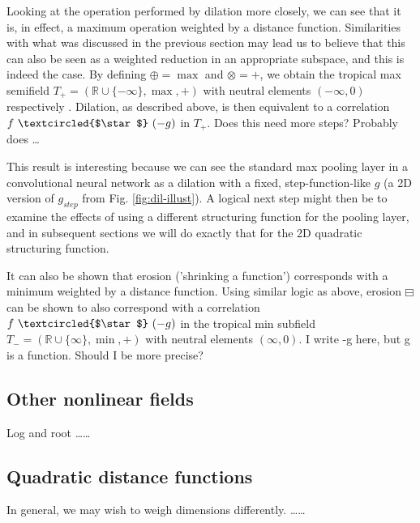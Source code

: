 \documentclass[11pt]{article} %
\def\comment#1{\color{red}#1\color{black}}
\begin{document}
Looking at the operation performed by dilation more closely, we can see that it is, in effect, a maximum operation weighted by a distance function. Similarities with what was discussed in the previous section may lead us to believe that this can also be seen as a weighted reduction in an appropriate subspace, and this is indeed the case. By defining $\oplus=\max$ and $\otimes=+$, we obtain the tropical max semifield $T_+=(\mathbb{R}\cup\{-\infty\},\max,+)$ with neutral elements $(-\infty, 0)$ respectively \cite{bellaardaxiomatic}. Dilation, as described above, is then equivalent to a correlation $f ~\textcircled{$\star$}~ (-g)$ in $T_+$. \comment{Does this need more steps? Probably does \ldots}

This result is interesting because we can see the standard max pooling layer in a convolutional neural network as a dilation with a fixed, step-function-like $g$ (a 2D version of $g_{step}$ from Fig. \ref{fig:dil-illust}). A logical next step might then be to examine the effects of using a different structuring function for the pooling layer, and in subsequent sections we will do exactly that for the 2D quadratic structuring function.

It can also be shown that erosion ('shrinking a function') corresponds with a minimum weighted by a distance function. Using similar logic as above, erosion $\boxminus$ can be shown to also correspond with a correlation $f ~\textcircled{$\star$}~ (-g)$ in the tropical min subfield $T_-=(\mathbb{R}\cup\{\infty\},\min,+)$ with neutral elements $(\infty, 0)$. \comment{I write -g here, but g is a function. Should I be more precise?}

\subsection{Other nonlinear fields}
Log and root \cite{bellaardaxiomatic} \comment{\ldots\ldots}

\subsection{Quadratic distance functions}
In general, we may wish to weigh dimensions differently. \comment{\ldots\ldots}
\end{document}
